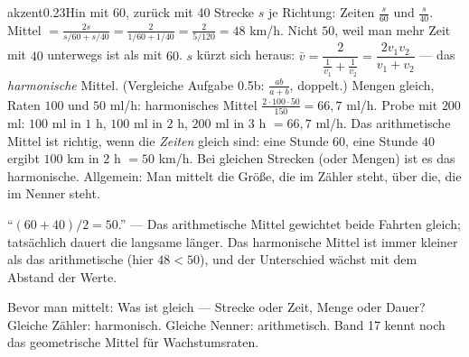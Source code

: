 \begin{loesungkarte}{akzent}{0.23}{Hin mit 60, zurück mit 40}
Strecke $s$ je Richtung: Zeiten $\frac s{60}$ und $\frac s{40}$. Mittel $= \frac{2s}{s/60 + s/40} = \frac{2}{1/60 + 1/40} = \frac2{5/120} = 48$ km/h. Nicht $50$, weil man mehr Zeit mit $40$ unterwegs ist als mit $60$.
$s$ kürzt sich heraus: $\bar v = \dfrac{2}{\frac1{v_1} + \frac1{v_2}} = \dfrac{2v_1v_2}{v_1 + v_2}$ --- das \emph{harmonische} Mittel. (Vergleiche Aufgabe 0.5b: $\frac{ab}{a + b}$, doppelt.)
Mengen gleich, Raten $100$ und $50$ ml/h: harmonisches Mittel $\frac{2\cdot100\cdot50}{150} = 66{,}7$ ml/h. Probe mit $200$ ml: $100$ ml in $1$ h, $100$ ml in $2$ h, $200$ ml in $3$ h $= 66{,}7$ ml/h. \checkmark
{}
Das arithmetische Mittel ist richtig, wenn die \emph{Zeiten} gleich sind: eine Stunde $60$, eine Stunde $40$ ergibt $100$ km in $2$ h $= 50$ km/h. Bei gleichen Strecken (oder Mengen) ist es das harmonische. Allgemein: Man mittelt die Größe, die im Zähler steht, über die, die im Nenner steht.
\begin{fehler}\kastentext
\enquote{$(60 + 40)/2 = 50$.} --- Das arithmetische Mittel gewichtet beide Fahrten gleich; tatsächlich dauert die langsame länger. Das harmonische Mittel ist immer kleiner als das arithmetische (hier $48 < 50$), und der Unterschied wächst mit dem Abstand der Werte.
\end{fehler}
\begin{mitnehmen}\kastentext
Bevor man mittelt: Was ist gleich --- Strecke oder Zeit, Menge oder Dauer? Gleiche Zähler: harmonisch. Gleiche Nenner: arithmetisch. Band 17 kennt noch das geometrische Mittel für Wachstumsraten.
\end{mitnehmen}
\end{loesungkarte}

